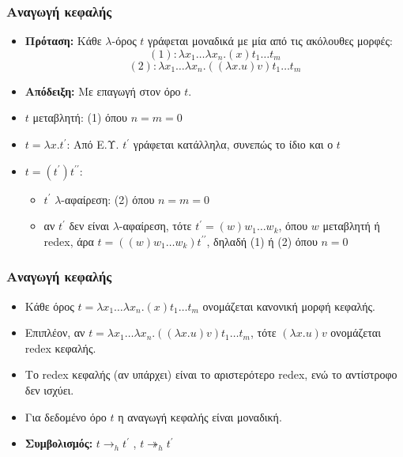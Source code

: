 \documentclass{beamer}
\begin{document}
\begin{frame}
\frametitle{Αναγωγή κεφαλής}
\begin{itemize}
\item \textbf{Πρόταση:} Κάθε $\lambda$-όρος $t$ γράφεται μοναδικά με μία από τις ακόλουθες μορφές: \pause
 $$(1): \lambda x_1 \ldots \lambda x_n . (x) t_1 \ldots t_m$$ 
 $$(2): \lambda x_1 \ldots \lambda x_n . ((\lambda x . u) v) t_1 \ldots t_m$$ \pause
\item \textbf{Απόδειξη:} Με επαγωγή στον όρο $t$. \pause
\item $t$ μεταβλητή: (1) όπου $n=m=0$ \pause
\item $t = \lambda x . t^\prime$: Από Ε.Υ. $t^\prime$ γράφεται κατάλληλα, συνεπώς το ίδιο και ο $t$ \pause
\item $t = (t^\prime) t^{\prime \prime}$:
	\begin{itemize}
	\item $t^\prime$ $\lambda$-αφαίρεση: (2) όπου $n=m=0$ \pause
	\item αν $t^\prime$ δεν είναι $\lambda$-αφαίρεση, τότε $t^\prime = (w) w_1 \ldots w_k$, όπου $w$ μεταβλητή ή redex, άρα  $t = ((w) w_1 \ldots w_k) t^{\prime \prime}$, δηλαδή (1) ή (2) όπου $n=0$
	\end{itemize}
\end{itemize}
\end{frame}

\begin{frame}
\frametitle{Αναγωγή κεφαλής}
\begin{itemize}
\item Κάθε όρος $t = \lambda x_1 \ldots \lambda x_n . (x) t_1 \ldots t_m$ ονομάζεται κανονική μορφή κεφαλής.\pause
\item Επιπλέον, αν $t = \lambda x_1 \ldots \lambda x_n . ((\lambda x . u) v) t_1 \ldots t_m$, τότε $(\lambda x . u) v$ ονομάζεται redex κεφαλής.\pause
\item Το redex κεφαλής (αν υπάρχει) είναι το αριστερότερο redex, ενώ το αντίστροφο δεν ισχύει.\pause
\item Για δεδομένο όρο $t$ η αναγωγή κεφαλής είναι μοναδική.
\item \textbf{Συμβολισμός:} $t \rightarrow _h t^\prime$ , $t \twoheadrightarrow _h t^\prime$ \pause
\end{itemize}
\end{frame}
\end{document}
